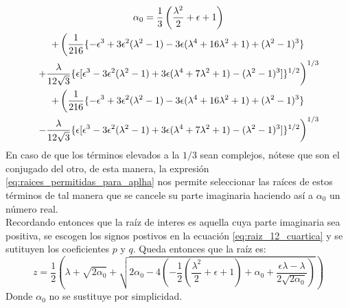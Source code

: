 \documentclass[12pt]{article}
\begin{document}
\begin{multline}
\label{eq:alpha_diferentes_omegas_reposo}
\alpha_0 = \frac{1}{3}\left(\frac{\lambda^2}{2} + \epsilon + 1 \right)\\
+ \left(\frac{1}{216}\lbrace-\epsilon^3+3\epsilon^2(\lambda^2-1)-
3\epsilon(\lambda^4 +16\lambda^2 +1)+ (\lambda^2 -1)^3\rbrace \right. \\
\left. +\frac{\lambda}{12\sqrt{3}}\lbrace\epsilon [\epsilon^3-3\epsilon^2(\lambda^2 -1)+3\epsilon(\lambda^4 + 7\lambda^2 +1)- (\lambda^2-1)^3]\rbrace^{1/2} \vphantom{\frac{1}{216}}\right)^{1/3}\\
+ \left(\frac{1}{216}\lbrace-\epsilon^3+3\epsilon^2(\lambda^2-1)-
3\epsilon(\lambda^4 +16\lambda^2 +1)+ (\lambda^2 -1)^3\rbrace \right. \\
\left. -\frac{\lambda}{12\sqrt{3}}\lbrace\epsilon [\epsilon^3-3\epsilon^2(\lambda^2 -1)+3\epsilon(\lambda^4 + 7\lambda^2 +1)- (\lambda^2-1)^3]\rbrace^{1/2} \vphantom{\frac{1}{216}}\right)^{1/3}
\end{multline}
En caso de que los términos elevados a la $1/3$ sean complejos, nótese que son el conjugado del otro, de esta manera, la expresión \ref{eq:raices_permitidas_para_aplha} nos permite seleccionar las raíces de estos términos de tal manera que se cancele su parte imaginaria haciendo así a $\alpha_0$ un número real.\\
Recordando entonces que la raíz de interes es aquella cuya parte imaginaria sea positiva, se escogen los signos postivos en la ecuación \ref{eq:raiz_12_cuartica} y se sutituyen los coeficientes $p$ y $q$. Queda entonces que la raíz es:
\begin{equation}
\label{eq:raiz_diferente_omega_reposo}
z= \frac{1}{2} \left( \lambda + \sqrt{2\alpha_0} + \sqrt{2\alpha_0 -4 \left(-\frac{1}{2}(\frac{\lambda^2}{2}+\epsilon+1)+\alpha_0 +\frac{\epsilon \lambda - \lambda}{2\sqrt{2\alpha_0}}\right)}\right)
\end{equation}
Donde $\alpha_0$ no se sustituye por simplicidad.
 

\end{document}
